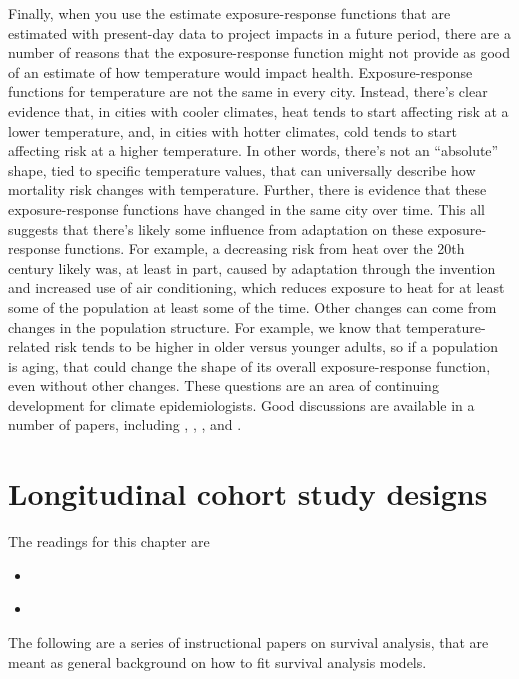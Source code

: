 \documentclass[
]{book}
\begin{document}
Finally, when you use the estimate exposure-response functions that are estimated with present-day data to project impacts in a future period, there are a number of reasons that the exposure-response function might not provide as good of an estimate of how temperature would impact health. Exposure-response functions for temperature are not the same in every city. Instead, there's clear evidence that, in cities with cooler climates, heat tends to start affecting risk at a lower temperature, and, in cities with hotter climates, cold tends to start affecting risk at a higher temperature. In other words, there's not an ``absolute'' shape, tied to specific temperature values, that can universally describe how mortality risk changes with temperature. Further, there is evidence that these exposure-response functions have changed in the same city over time. This all suggests that there's likely some influence from adaptation on these exposure-response functions. For example, a decreasing risk from heat over the 20th century likely was, at least in part, caused by adaptation through the invention and increased use of air conditioning, which reduces exposure to heat for at least some of the population at least some of the time. Other changes can come from changes in the population structure. For example, we know that temperature-related risk tends to be higher in older versus younger adults, so if a population is aging, that could change the shape of its overall exposure-response function, even without other changes. These questions are an area of continuing development for climate epidemiologists. Good discussions are available in a number of papers, including \citet{kinney2008approaches}, \citet{arbuthnott2016changes}, \citet{gosling2017adaptation}, and \citet{kinney2018temporal}.

\hypertarget{longitudinal-cohort-study-designs}{%
\chapter{Longitudinal cohort study designs}\label{longitudinal-cohort-study-designs}}

The readings for this chapter are

\begin{itemize}
\item
  \citet{andersson201970}
\item
  \citet{wong1989risk}
\end{itemize}

The following are a series of instructional papers on survival analysis, that are
meant as general background on how to fit survival analysis models.
\end{document}
